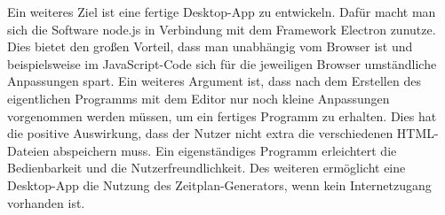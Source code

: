 Ein weiteres Ziel ist eine fertige Desktop-App zu entwickeln. Dafür macht man sich die Software node.js in Verbindung mit dem Framework Electron zunutze. Dies bietet den großen Vorteil, dass man unabhängig vom Browser ist und beispielsweise im JavaScript-Code sich für die jeweiligen Browser umständliche Anpassungen spart. Ein weiteres Argument ist, dass nach dem Erstellen des eigentlichen Programms mit dem Editor nur noch kleine Anpassungen vorgenommen werden müssen, um ein fertiges Programm zu erhalten. Dies hat die positive Auswirkung, dass der Nutzer nicht extra die verschiedenen HTML-Dateien abspeichern muss. Ein eigenständiges Programm erleichtert die Bedienbarkeit und die Nutzerfreundlichkeit. Des weiteren ermöglicht eine Desktop-App die Nutzung des Zeitplan-Generators, wenn kein Internetzugang vorhanden ist. 

